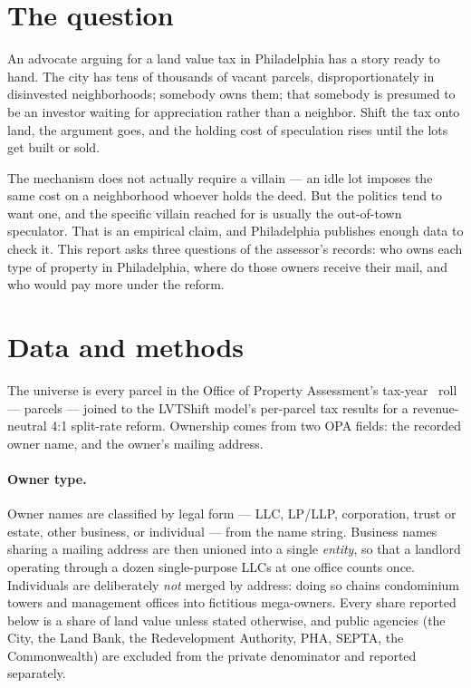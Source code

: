 \documentclass[11pt]{article}
\begin{document}
\section{The question}

An advocate arguing for a land value tax in Philadelphia has a story ready to hand. The city
has tens of thousands of vacant parcels, disproportionately in disinvested neighborhoods;
somebody owns them; that somebody is presumed to be an investor waiting for appreciation
rather than a neighbor. Shift the tax onto land, the argument goes, and the holding cost of
speculation rises until the lots get built or sold.

The mechanism does not actually require a villain --- an idle lot imposes the same cost on a
neighborhood whoever holds the deed. But the politics tend to want one, and the specific
villain reached for is usually the out-of-town speculator. That is an empirical claim, and
Philadelphia publishes enough data to check it. This report asks three questions of the
assessor's records: who owns each type of property in Philadelphia, where do those owners
receive their mail, and who would pay more under the reform.

\section{Data and methods}

The universe is every parcel in the Office of Property Assessment's tax-year~\PhilOwnTaxYear{}
roll --- \PhilOwnTotalParcels{} parcels --- joined to the LVTShift model's per-parcel tax
results for a revenue-neutral 4:1 split-rate reform. Ownership comes from two OPA fields: the
recorded owner name, and the owner's mailing address.

\paragraph{Owner type.} Owner names are classified by legal form --- LLC, LP/LLP,
corporation, trust or estate, other business, or individual --- from the name string.
Business names sharing a mailing address are then unioned into a single \emph{entity}, so
that a landlord operating through a dozen single-purpose LLCs at one office counts once.
Individuals are deliberately \emph{not} merged by address: doing so chains condominium towers
and management offices into fictitious mega-owners. Every share reported below is a share of
land value unless stated otherwise, and public agencies (the City, the Land Bank, the
Redevelopment Authority, PHA, SEPTA, the Commonwealth) are excluded from the private
denominator and reported separately.
\end{document}
